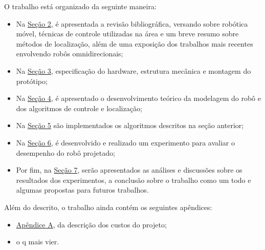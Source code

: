 O trabalho está organizado da seguinte maneira:
\begin{itemize}
  \item{Na \hyperref[sec:revbib]{Seção 2}, é apresentada a revisão bibliográfica, versando sobre robótica móvel, técnicas de controle utilizadas na área e um breve resumo sobre métodos de localização, além de uma exposição dos trabalhos mais recentes envolvendo robôs omnidirecionais;} %
  \item{Na \hyperref[sec:montagem]{Seção 3}, especificação do hardware, estrutura mecânica e montagem do protótipo;}
  \item{Na \hyperref[sec:teorico]{Seção 4}, é apresentado o desenvolvimento teórico da modelagem do robô e dos algoritmos de controle e localização;}
  \item{Na \hyperref[sec:software]{Seção 5} são implementados os algoritmos descritos na seção anterior;}
  \item{Na \hyperref[sec:experimental]{Seção 6}, é desenvolvido e realizado um experimento para avaliar o desempenho do robô projetado;}
  \item{Por fim, na \hyperref[sec:resultados]{Seção 7}, serão apresentados as análises e discussões sobre os resultados dos experimentos, a conclusão sobre o trabalho como um todo e algumas propostas para futuros trabalhos.}
\end{itemize}

Além do descrito, o trabalho ainda contém os seguintes apêndices:
\begin{itemize}
  \item{\hyperref[sec:custo]{Apêndice A}, da descrição dos custos do projeto;}
  \item{o q mais vier.}
\end{itemize}
